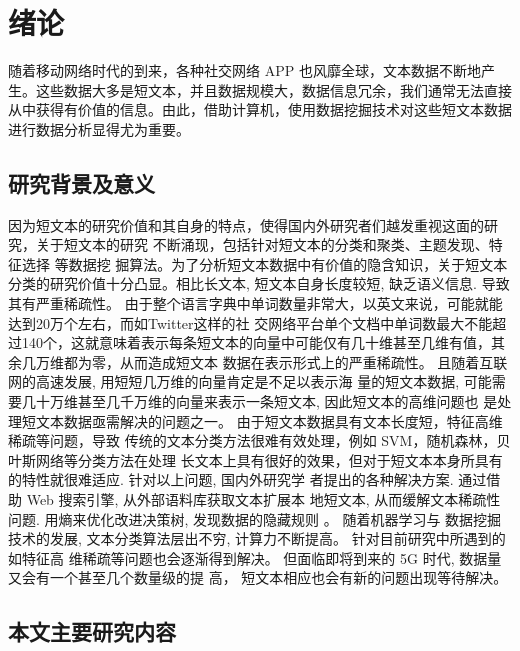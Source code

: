 
\chapter{绪论}

随着移动网络时代的到来，各种社交网络 APP 也风靡全球，文本数据不断地产生。这些数据大多是短文本，并且数据规模大，数据信息冗余，我们通常无法直接从中获得有价值的信息。由此，借助计算机，使用数据挖掘技术对这些短文本数据进行数据分析显得尤为重要。

\section{研究背景及意义}
因为短文本的研究价值和其自身的特点，使得国内外研究者们越发重视这面的研究，关于短文本的研究
不断涌现，包括针对短文本的分类\cite{Ge2014Short,Sriram2010Short}和聚类\cite{Rakib2020Enhancement, 杨波2019基于词向量和增量聚类的短文本聚类算法}、主题发现\cite{Hu2018Online,Lee2016Sequential}、特征选择\cite{Xuegang2018A,李太白短文本分类中特征选择算法的研究,Jinbao2020Chinese} 等数据挖
掘算法。为了分析短文本数据中有价值的隐含知识，关于短文本分类的研究价值十分凸显。相比长文本, 短文本自身长度较短, 缺乏语义信息. 导致其有严重稀疏性。
由于整个语言字典中单词数量非常大，以英文来说，可能就能达到20万个左右，而如Twitter这样的社
交网络平台单个文档中单词数最大不能超过140个，这就意味着表示每条短文本的向量中可能仅有几十维甚至几维有值，其余几万维都为零，从而造成短文本
数据在表示形式上的严重稀疏性。 且随着互联网的高速发展, 用短短几万维的向量肯定是不足以表示海
量的短文本数据, 可能需要几十万维甚至几千万维的向量来表示一条短文本, 因此短文本的高维问题也
是处理短文本数据亟需解决的问题之一。 由于短文本数据具有文本长度短，特征高维稀疏等问题，导致
传统的文本分类方法很难有效处理，例如 SVM\cite{vapnik1999an}，随机森林\cite{svetnik2003random}，贝叶斯网络\cite{friedman1997bayesian}等分类方法在处理
长文本上具有很好的效果，但对于短文本本身所具有的特性就很难适应. 针对以上问题, 国内外研究学
者提出的各种解决方案. 通过借助 Web 搜索引擎, 从外部语料库获取文本扩展本
地短文本, 从而缓解文本稀疏性问题\cite{yang1999a}.
用熵来优化改进决策树, 发现数据的隐藏规则\cite{Ali2012Improved} 。 随着机器学习与
数据挖掘技术的发展, 文本分类算法层出不穷, 计算力不断提高。 针对目前研究中所遇到的如特征高
维稀疏等问题也会逐渐得到解决。 但面临即将到来的 5G 时代, 数据量又会有一个甚至几个数量级的提
高， 短文本相应也会有新的问题出现等待解决。

\section{本文主要研究内容}   
